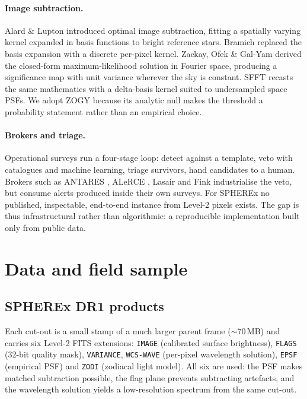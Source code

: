 \documentclass[11pt,a4paper]{article}
\newcommand{\code}[1]{\texttt{\small #1}}
\begin{document}
{\paragraph{Image subtraction.}
Alard \& Lupton \cite{alard} introduced optimal image subtraction, fitting a spatially varying kernel
expanded in basis functions to bright reference stars. Bramich \cite{bramich} replaced the basis
expansion with a discrete per-pixel kernel. Zackay, Ofek \& Gal-Yam \cite{zogy} derived the
closed-form maximum-likelihood solution in Fourier space, producing a significance map with unit
variance wherever the sky is constant. SFFT \cite{sfft} recasts the same mathematics with a
delta-basis kernel suited to undersampled space PSFs. We adopt ZOGY because its analytic null makes
the threshold a probability statement rather than an empirical choice.

\paragraph{Brokers and triage.}
Operational surveys run a four-stage loop: detect against a template, veto with catalogues and
machine learning, triage survivors, hand candidates to a human. Brokers such as ANTARES
\cite{antares}, ALeRCE \cite{alerce}, Lasair \cite{lasair} and Fink \cite{fink} industrialise the
veto, but consume alerts produced inside their own surveys. For SPHEREx no published, inspectable,
end-to-end instance from Level-2 pixels exists. The gap is thus infrastructural rather than
algorithmic: a reproducible implementation built only from public data.

\section{Data and field sample}

\subsection{SPHEREx DR1 products}
Each cut-out is a small stamp of a much larger parent frame ($\sim$70\,MB) and carries six Level-2
FITS extensions: \code{IMAGE} (calibrated surface brightness), \code{FLAGS} (32-bit quality mask),
\code{VARIANCE}, \code{WCS-WAVE} (per-pixel wavelength solution), \code{EPSF} (empirical PSF) and
\code{ZODI} (zodiacal light model). All six are used: the PSF makes matched subtraction possible,
the flag plane prevents subtracting artefacts, and the wavelength solution yields a
low-resolution spectrum from the same cut-out.

}
\end{document}
